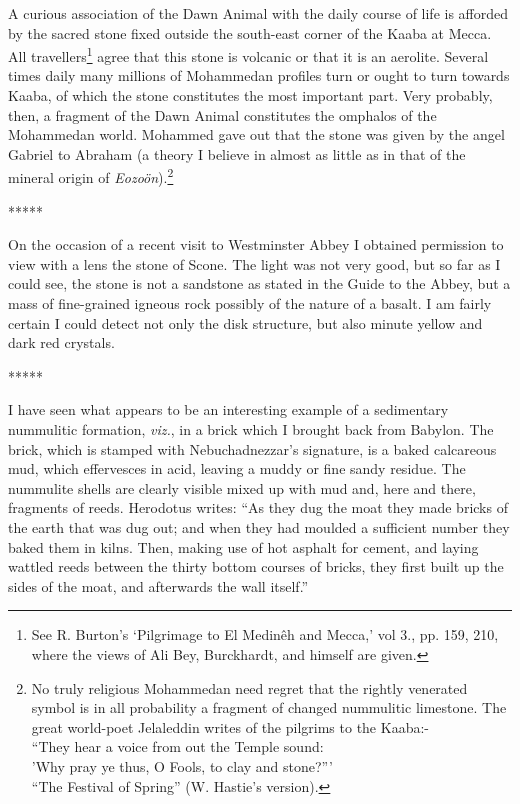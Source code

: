 \documentclass[a4paper, 12pt, oneside]{article}
\begin{document}
A curious association of the Dawn Animal with the daily course of life is afforded by the sacred stone fixed outside the south-east corner of the Kaaba at Mecca. All travellers\footnote{See R. Burton's `Pilgrimage to El Medinêh and Mecca,' vol 3., pp. 159, 210, where the views of Ali Bey, Burckhardt, and himself are given.} agree that this stone is volcanic or that it is an aerolite. Several times daily many millions of Mohammedan profiles turn or ought to turn towards Kaaba, of which the stone constitutes the most important part. Very probably, then, a fragment of the Dawn Animal constitutes the omphalos of the Mohammedan world. Mohammed gave out that the stone was given by the angel Gabriel to Abraham (a theory I believe in almost as little as in that of the mineral origin of \emph{Eozoön}).\footnote{No truly religious Mohammedan need regret that the rightly venerated symbol is in all probability a fragment of changed nummulitic limestone. The great world-poet Jelaleddin writes of the pilgrims to the Kaaba:-\\
``They hear a voice from out the Temple sound:\\
\hspace*{5mm}'Why pray ye thus, O Fools, to clay and stone?'''\\
\hspace*{10mm}``The Festival of Spring'' (W. Hastie's version).}

\centerline{*\hspace{15mm}*\hspace{15mm}*\hspace{15mm}*\hspace{15mm}*}
\bigskip

On the occasion of a recent visit to Westminster Abbey I obtained permission to view with a lens the stone of Scone. The light was not very good, but so far as I could see, the stone is not a sandstone as stated in the Guide to the Abbey, but a mass of fine-grained igneous rock possibly of the nature of a basalt. I am fairly certain I could detect not only the disk structure, but also minute yellow and dark red crystals.

\centerline{*\hspace{15mm}*\hspace{15mm}*\hspace{15mm}*\hspace{15mm}*}
\bigskip

I have seen what appears to be an interesting example of a sedimentary nummulitic formation, \emph{viz.}, in a brick which I brought back from Babylon. The brick, which is stamped with Nebuchadnezzar's signature, is a baked calcareous mud, which effervesces in acid, leaving a muddy or fine sandy residue. The nummulite shells are clearly visible mixed up with mud and, here and there, fragments of reeds. Herodotus writes: ``As they dug the moat they made bricks of the earth that was dug out; and when they had moulded a sufficient number they baked them in kilns. Then, making use of hot asphalt for cement, and laying wattled reeds between the thirty bottom courses of bricks, they first built up the sides of the moat, and afterwards the wall itself.''
\end{document}
